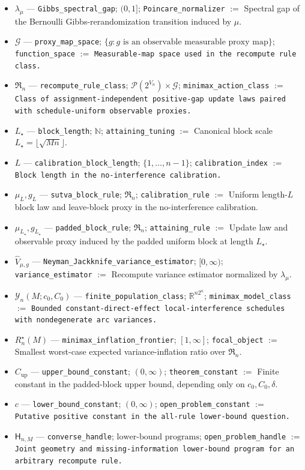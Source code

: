 \documentclass{article}
\begin{document}
\begin{itemize}
  \item \(\lambda_\mu\) --- \texttt{Gibbs\_spectral\_gap}; \((0,1]\); \texttt{Poincare\_normalizer} $:=$ Spectral gap of the Bernoulli Gibbs-rerandomization transition induced by \(\mu\).
  \item \(\mathcal G\) --- \texttt{proxy\_map\_space}; \(\{g:g\text{ is an observable measurable proxy map}\}\); \texttt{function\_space} $:=$ \texttt{Measurable-map space used in the recompute rule class.}
  \item \(\mathfrak R_n\) --- \texttt{recompute\_rule\_class}; \(\mathcal P(2^{V_n})\times\mathcal G\); \texttt{minimax\_action\_class} $:=$ \texttt{Class of assignment-independent positive-gap update laws paired with schedule-uniform observable proxies.}
  \item \(L_\star\) --- \texttt{block\_length}; \(\mathbb N\); \texttt{attaining\_tuning} $:=$ Canonical block scale \(L_\star=\lfloor\sqrt{Mn}\rfloor\).
  \item \(L\) --- \texttt{calibration\_block\_length}; \(\{1,\ldots,n-1\}\); \texttt{calibration\_index} $:=$ \texttt{Block length in the no-interference calibration.}
  \item \(\mu_L,g_L\) --- \texttt{sutva\_block\_rule}; \(\mathfrak R_n\); \texttt{calibration\_rule} $:=$ Uniform length-\(L\) block law and leave-block proxy in the no-interference calibration.
  \item \(\mu_{L_\star},g_{L_\star}\) --- \texttt{padded\_block\_rule}; \(\mathfrak R_n\); \texttt{attaining\_rule} $:=$ Update law and observable proxy induced by the padded uniform block at length \(L_\star\).
  \item \(\widehat V_{\mu,g}\) --- \texttt{Neyman\_Jackknife\_variance\_estimator}; \([0,\infty)\); \texttt{variance\_estimator} $:=$ Recompute variance estimator normalized by \(\lambda_\mu\).
  \item \(\mathcal Y_n(M;c_0,C_0)\) --- \texttt{finite\_population\_class}; \(\mathbb R^{n2^n}\); \texttt{minimax\_model\_class} $:=$ \texttt{Bounded constant-direct-effect local-interference schedules with nondegenerate arc variances.}
  \item \(R_n^\star(M)\) --- \texttt{minimax\_inflation\_frontier}; \([1,\infty]\); \texttt{focal\_object} $:=$ Smallest worst-case expected variance-inflation ratio over \(\mathfrak R_n\).
  \item \(C_{\mathrm{up}}\) --- \texttt{upper\_bound\_constant}; \((0,\infty)\); \texttt{theorem\_constant} $:=$ Finite constant in the padded-block upper bound, depending only on \(c_0,C_0,\delta\).
  \item \(c\) --- \texttt{lower\_bound\_constant}; \((0,\infty)\); \texttt{open\_problem\_constant} $:=$ \texttt{Putative positive constant in the all-rule lower-bound question.}
  \item \(\mathsf H_{n,M}\) --- \texttt{converse\_handle}; \(\text{lower-bound programs}\); \texttt{open\_problem\_handle} $:=$ \texttt{Joint geometry and missing-information lower-bound program for an arbitrary recompute rule.}
\end{itemize}
\end{document}
